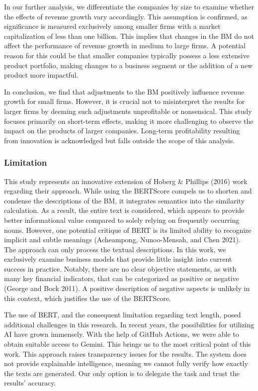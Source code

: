\documentclass[
]{article}
\begin{document}
In our further analysis, we differentiate the companies by size to
examine whether the effects of revenue growth vary accordingly. This
assumption is confirmed, as significance is measured exclusively among
smaller firms with a market capitalization of less than one billion.
This implies that changes in the BM do not affect the performance of
revenue growth in medium to large firms. A potential reason for this
could be that smaller companies typically possess a less extensive
product portfolio, making changes to a business segment or the addition
of a new product more impactful.

In conclusion, we find that adjustments to the BM positively influence
revenue growth for small firms. However, it is crucial not to
misinterpret the results for larger firms by deeming such adjustments
unprofitable or nonsensical. This study focuses primarily on short-term
effects, making it more challenging to observe the impact on the
products of larger companies. Long-term profitability resulting from
innovation is acknowledged but falls outside the scope of this analysis.

\subsubsection{Limitation}\label{limitation}

This study represents an innovative extension of Hoberg \& Phillips
(2016) work regarding their approach. While using the BERTScore compels
us to shorten and condense the descriptions of the BM, it integrates
semantics into the similarity calculation. As a result, the entire text
is considered, which appears to provide better informational value
compared to solely relying on frequently occurring nouns. However, one
potential critique of BERT is its limited ability to recognize implicit
and subtle meanings (Acheampong, Nunoo-Mensah, and Chen 2021). The
approach can only process the textual descriptions. In this work, we
exclusively examine business models that provide little insight into
current success in practice. Notably, there are no clear objective
statements, as with many key financial indicators, that can be
categorized as positive or negative (George and Bock 2011). A positive
description of negative aspects is unlikely in this context, which
justifies the use of the BERTScore.

The use of BERT, and the consequent limitation regarding text length,
posed additional challenges in this research. In recent years, the
possibilities for utilizing AI have grown immensely. With the help of
GitHub Actions, we were able to obtain suitable access to Gemini. This
brings us to the most critical point of this work. This approach raises
transparency issues for the results. The system does not provide
explainable intelligence, meaning we cannot fully verify how exactly the
texts are generated. Our only option is to delegate the task and trust
the results' accuracy.
\end{document}

